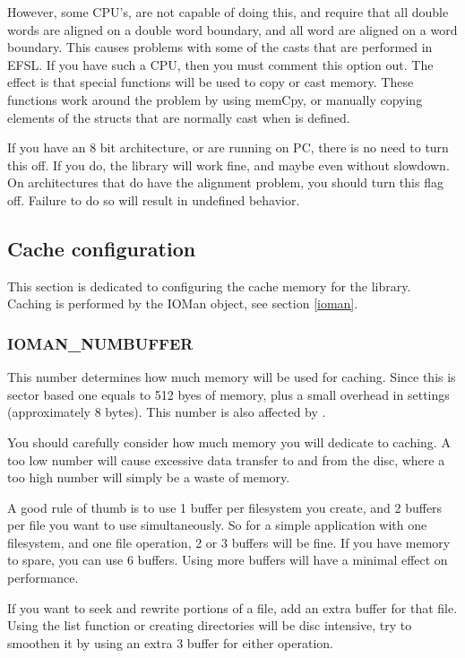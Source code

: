 However, some CPU's, are not capable of doing this, and require that all double words
are aligned on a double word boundary, and all word are aligned on a word boundary.
This causes problems with some of the casts that are performed in EFSL. If you have such
a CPU, then you must comment this option out. The effect is that special functions
will be used to copy or cast memory. These functions work around the problem by
using memCpy, or manually copying elements of the structs that are normally cast when
 is defined.

If you have an 8 bit architecture, or are running on PC, there is no need to turn this
off. If you do, the library will work fine, and maybe even without slowdown.
On architectures that do have the alignment problem, you should turn this flag off.
Failure to do so will result in undefined behavior.

\subsection{Cache configuration}
This section is dedicated to configuring the cache memory for the library. Caching
is performed by the IOMan object, see section \ref{ioman}.
\subsubsection*{IOMAN\_NUMBUFFER}
This number determines how much memory will be used for caching. Since this
is sector based one  equals to 512 byes of memory, plus
a small overhead in settings (approximately 8 bytes). This number is also affected
by .

You should carefully consider how much memory you will dedicate to caching. A too
low number will cause excessive data transfer to and from the disc, where a too high
number will simply be a waste of memory.

A good rule of thumb is to use 1 buffer per filesystem you create, and 2 buffers
per file you want to use simultaneously. So for a simple application with
one filesystem, and one file operation, 2 or 3 buffers will be fine. If you have memory
to spare, you can use 6 buffers. Using more buffers will have a minimal effect on
performance.

If you want to seek and rewrite portions of a file, add an extra buffer for that file.
Using the list function or creating directories will be disc intensive, try to smoothen
it by using an extra 3 buffer for either operation.

